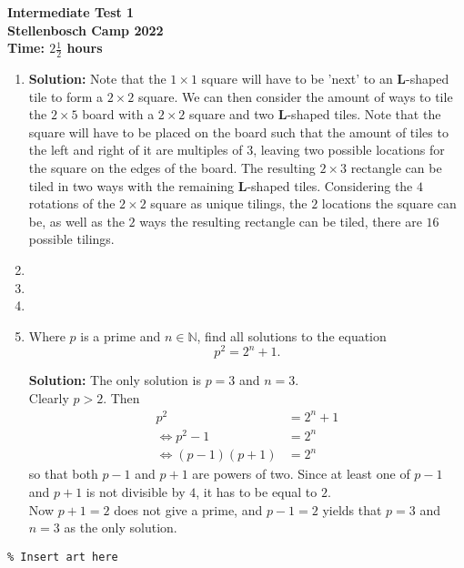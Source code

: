\documentclass{article}
\begin{document}
\thispagestyle{empty}

\begin{center}
  \textbf{\Large Intermediate Test 1}
  \\ \vspace{1em}
  \textbf{\large Stellenbosch Camp 2022}
  \\ \vspace{1em}
  \textbf{\large Time: $2\frac{1}{2}$ hours}
\end{center}

\bigskip

\begin{enumerate}[itemsep=\fill]
	


\item %
\textbf{Solution:} Note that the $1\times1$ square will have to be 'next' to an $\mathbf{L}$-shaped tile to form a $2\times2$ square. We can then consider the amount of ways to tile the $2\times5$ board with a $2\times2$ square and two $\mathbf{L}$-shaped tiles. Note that the square will have to be placed on the board such that the amount of tiles to the left and right of it are multiples of $3$, leaving two possible locations for the square on the edges of the board. The resulting $2\times3$ rectangle can be tiled in two ways with the remaining $\mathbf{L}$-shaped tiles. Considering the $4$ rotations of the $2\times2$ square as unique tilings, the $2$ locations the square can be, as well as the $2$ ways the resulting rectangle can be tiled, there are $16$ possible tilings. 


\item %

\item %


\item %


\item %
Where $p$ is a prime and $n\in\mathbb{N}$, find all solutions to the equation \[p^2 = 2^n + 1.\]

\textbf{Solution:} The only solution is $p = 3$ and $n = 3$.
\\ Clearly $p>2$. Then 
\begin{align*}
	p^2 &= 2^n + 1
	\\ \iff p^2-1 &= 2^n
	\\ \iff (p-1)(p+1) &= 2^n
\end{align*}
so that both $p-1$ and $p+1$ are powers of two. Since at least one of $p-1$ and $p+1$ is not divisible by $4$, it has to be equal to $2$.
\\ Now $p+1 = 2$ does not give a prime, and $p-1 = 2$ yields that $p =3$ and $n=3$ as the only solution. 


\end{enumerate}


\centering
\small
\begin{BVerbatim}
\end{BVerbatim}
\end{document}
